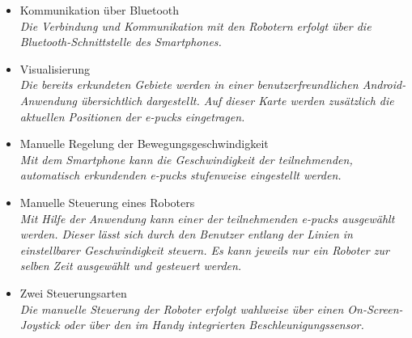 \documentclass[10pt,a4paper]{article}
\begin{document}
\begin{itemize}
				\begin{itemize}
					\item Kommunikation über Bluetooth
						\\ \textsl{Die Verbindung und Kommunikation mit den Robotern erfolgt über die Bluetooth-Schnittstelle des
							Smartphones.}
					\item Visualisierung
						\\ \textsl{Die bereits erkundeten Gebiete werden in einer benutzerfreundlichen Android-Anwendung übersichtlich
							dargestellt. Auf dieser Karte werden zusätzlich die aktuellen Positionen der e-pucks eingetragen.}
					\item Manuelle Regelung der Bewegungsgeschwindigkeit
						\\ \textsl{Mit dem Smartphone kann die Geschwindigkeit der teilnehmenden, automatisch erkundenden e-pucks stufenweise 										eingestellt werden.}	
					\item Manuelle Steuerung eines Roboters
						\\ \textsl{Mit Hilfe der Anwendung kann einer der teilnehmenden e-pucks ausgewählt werden. Dieser lässt sich
							durch den Benutzer entlang der Linien in einstellbarer Geschwindigkeit steuern. Es kann jeweils nur ein Roboter
							zur selben Zeit ausgewählt und gesteuert werden.}		
					\item Zwei Steuerungsarten
						\\ \textsl{Die manuelle Steuerung der Roboter erfolgt wahlweise über einen On-Screen-Joystick oder über
							den im Handy integrierten Beschleunigungssensor.}											
				\end{itemize}
			\end{itemize}
\end{document}
